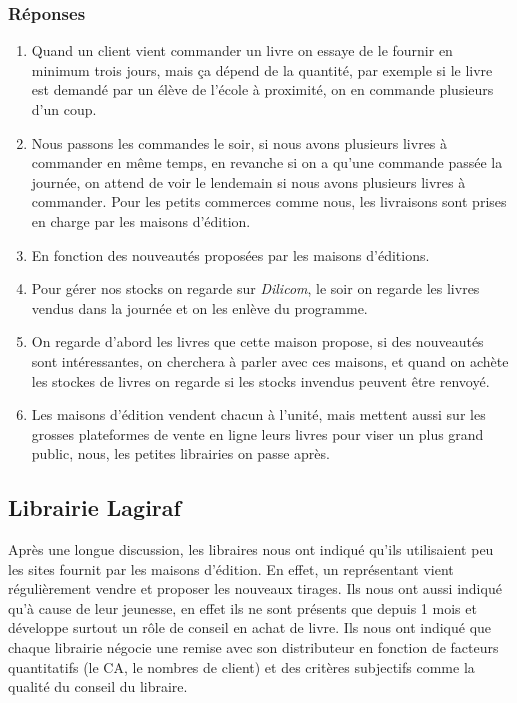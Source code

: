 \documentclass[a4paper, 13pt]{article}
\begin{document}
\subsubsection{Réponses}
\begin{enumerate}
    \item Quand un client vient commander un livre on essaye de le fournir en minimum trois jours, mais ça dépend de la quantité, par exemple si le livre est demandé par un élève de l'école à proximité, on en commande plusieurs d'un coup.
    \item Nous passons les commandes le soir, si nous avons plusieurs livres à commander en même temps, en revanche si on a qu'une commande passée la journée, on attend de voir le lendemain si nous avons plusieurs livres à commander. Pour les petits commerces comme nous, les livraisons sont prises en charge par les maisons d'édition.
    \item En fonction des nouveautés proposées par les maisons d'éditions.
    \item Pour gérer nos stocks on regarde sur \textit{Dilicom}, le soir on regarde les livres vendus dans la journée et on les enlève du programme.
    \item On regarde d'abord les livres que cette maison propose, si des nouveautés sont intéressantes, on cherchera à parler avec ces maisons, et quand on achète les stockes de livres on regarde si les stocks invendus peuvent être renvoyé.
    \item Les maisons d'édition vendent chacun à l'unité, mais mettent aussi sur les grosses plateformes de vente en ligne leurs livres pour viser un plus grand public, nous, les petites librairies on passe après.
\end{enumerate}
\subsection{Librairie Lagiraf}
Après une longue discussion, les libraires nous ont indiqué qu'ils utilisaient peu les sites fournit par les maisons d'édition. En effet, un représentant vient régulièrement vendre et proposer les nouveaux tirages. Ils nous ont aussi indiqué qu'à cause de leur jeunesse, en effet ils ne sont présents que depuis 1 mois et développe surtout un rôle de conseil en achat de livre. Ils nous ont indiqué que chaque librairie négocie une remise avec son distributeur en fonction de facteurs quantitatifs (le CA, le nombres de client) et des critères subjectifs comme la qualité du conseil du libraire.
\end{document}
